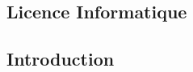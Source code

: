 \documentclass[10pt, a5paper]{report}
\begin{document}
\begin{spacing}{1.5}

\chapter*{Licence Informatique}

\footnotesize
\section*{Introduction}





\end{spacing}
\end{document}
